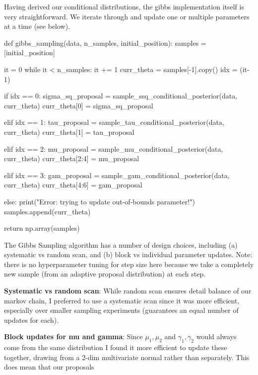 \documentclass[12pt,letterpaper,twoside]{article}
\begin{document}
Having derived our conditional distributions, the gibbs implementation
itself is very straightforward. We iterate through and update one or 
multiple parameters at a time (see below).  
\begin{python}
def gibbs_sampling(data, n_samples, initial_position):
    samples = [initial_position]

    it = 0
    while it < n_samples:
        it += 1
        curr_theta = samples[-1].copy()
        idx = (it-1) %

        if idx == 0:
            sigma_sq_proposal = sample_ssq_conditional_posterior(data, curr_theta)
            curr_theta[0] = sigma_sq_proposal

        elif idx == 1:
            tau_proposal = sample_tau_conditional_posterior(data, curr_theta)
            curr_theta[1] = tau_proposal

        elif idx == 2:
            mu_proposal = sample_mu_conditional_posterior(data, curr_theta)
            curr_theta[2:4] = mu_proposal

        elif idx == 3:
            gam_proposal = sample_gam_conditional_posterior(data, curr_theta)
            curr_theta[4:6] = gam_proposal

        else:
            print("Error: trying to update out-of-bounds parameter!")
        samples.append(curr_theta)

    return np.array(samples)
\end{python}

The Gibbs Sampling algorithm has a number of design 
choices, including (a) systematic vs random scan, and
(b) block vs individual parameter updates. Note: there 
is no hyperparameter tuning for step size here because 
we take a completely new sample (from an adaptive proposal 
distribution) at each step.

\textbf{Systematic vs random scan}: While random scan ensures 
detail balance of our markov chain, I preferred to use a 
systematic scan since it was more efficient, especially over 
smaller sampling experiments (guarantees an equal number of 
updates for each).

\textbf{Block updates for mu and gamma}: Since $\mu_1, \mu_2$ 
and $\gamma_1, \gamma_2$ would always come from the same 
distribution I found it more efficient to update these together, 
drawing from a 2-dim multivariate normal rather than separately. 
This does mean that our proposals
\end{document}
